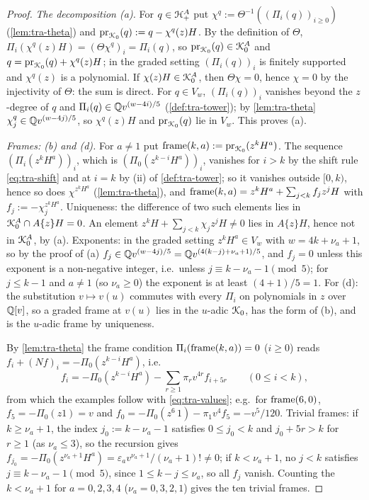 \begin{proof}
\emph{The decomposition (a).} For $q\in\mathcal{H}^A_+$ put $\chi^q := \Theta^{-1}((\Pi_i(q))_{i\geq 0})$ (\cref{lem:tra-theta}) and $\mathrm{pr}_{\mathcal{K}_{0}}(q) := q-\chi^q(z)H$. By the definition of $\Theta$, $\Pi_i(\chi^q(z)H) = (\Theta\chi^q)_i = \Pi_i(q)$, so $\mathrm{pr}_{\mathcal{K}_{0}}(q)\in\mathcal{K}_{0}^A$ and $q = \mathrm{pr}_{\mathcal{K}_{0}}(q)+\chi^q(z)H$; in the graded setting $(\Pi_i(q))_i$ is finitely supported and $\chi^q(z)$ is a polynomial. If $\chi(z)H\in\mathcal{K}_{0}^A$, then $\Theta\chi = 0$, hence $\chi = 0$ by the injectivity of $\Theta$: the sum is direct. For $q\in V_w$, $(\Pi_i(q))_i$ vanishes beyond the $z$-degree of $q$ and $\Pi_i(q)\in\mathbb{Q} v^{(w-4i)/5}$ (\cref{def:tra-tower}); by \cref{lem:tra-theta} $\chi^q_j\in\mathbb{Q} v^{(w-4j)/5}$, so $\chi^q(z)H$ and $\mathrm{pr}_{\mathcal{K}_{0}}(q)$ lie in $V_w$. This proves (a).

\emph{Frames: (b) and (d).} For $a\neq 1$ put $\mathrm{frame}(k,a) := \mathrm{pr}_{\mathcal{K}_{0}}(z^kH^a)$. The sequence $(\Pi_i(z^kH^a))_i$, which is $(\Pi_0(z^{k-i}H^a))_i$, vanishes for $i>k$ by the shift rule \eqref{eq:tra-shift} and at $i = k$ by (ii) of \cref{def:tra-tower}; so it vanishes outside $[0,k)$, hence so does $\chi^{z^kH^a}$ (\cref{lem:tra-theta}), and $\mathrm{frame}(k,a) = z^kH^a+\sum_{j<k}f_jz^jH$ with $f_j := -\chi^{z^kH^a}_j$. Uniqueness: the difference of two such elements lies in $\mathcal{K}_{0}^A\cap A\{z\}H = 0$. An element $z^kH+\sum_{j<k}\chi_jz^jH\neq 0$ lies in $A\{z\}H$, hence not in $\mathcal{K}_{0}^A$, by (a). Exponents: in the graded setting $z^kH^a\in V_w$ with $w = 4k+\nu_a+1$, so by the proof of (a) $f_j\in\mathbb{Q} v^{(w-4j)/5} = \mathbb{Q} v^{(4(k-j)+\nu_a+1)/5}$, and $f_j = 0$ unless this exponent is a non-negative integer, i.e.\ unless $j\equiv k-\nu_a-1\pmod 5$; for $j\leq k-1$ and $a\neq 1$ (so $\nu_a\geq 0$) the exponent is at least $(4+1)/5 = 1$. For (d): the substitution $v\mapsto v(u)$ commutes with every $\Pi_i$ on polynomials in $z$ over $\mathbb{Q}[v]$, so a graded frame at $v(u)$ lies in the $u$-adic $\mathcal{K}_{0}$, has the form of (b), and is the $u$-adic frame by uniqueness.

By \cref{lem:tra-theta} the frame condition $\Pi_i(\mathrm{frame}(k,a)) = 0$ ($i\geq 0$) reads $f_i+(Nf)_i = -\Pi_0(z^{k-i}H^a)$, i.e.
\[
f_i = -\Pi_0(z^{k-i}H^a)-\sum_{r\geq 1}\pi_rv^{4r}f_{i+5r}\qquad(0\leq i<k),
\]
from which the examples follow with \eqref{eq:tra-values}; e.g.\ for $\mathrm{frame}(6,0)$, $f_5 = -\Pi_0(z1) = v$ and $f_0 = -\Pi_0(z^6\,1)-\pi_1v^4f_5 = -v^5/120$. Trivial frames: if $k\geq\nu_a+1$, the index $j_0 := k-\nu_a-1$ satisfies $0\leq j_0<k$ and $j_0+5r>k$ for $r\geq 1$ (as $\nu_a\leq 3$), so the recursion gives $f_{j_0} = -\Pi_0(z^{\nu_a+1}H^a) = \varepsilon_av^{\nu_a+1}/(\nu_a+1)!\neq 0$; if $k<\nu_a+1$, no $j<k$ satisfies $j\equiv k-\nu_a-1\pmod 5$, since $1\leq k-j\leq\nu_a$, so all $f_j$ vanish. Counting the $k<\nu_a+1$ for $a = 0,2,3,4$ ($\nu_a = 0,3,2,1$) gives the ten trivial frames.


\end{proof}
